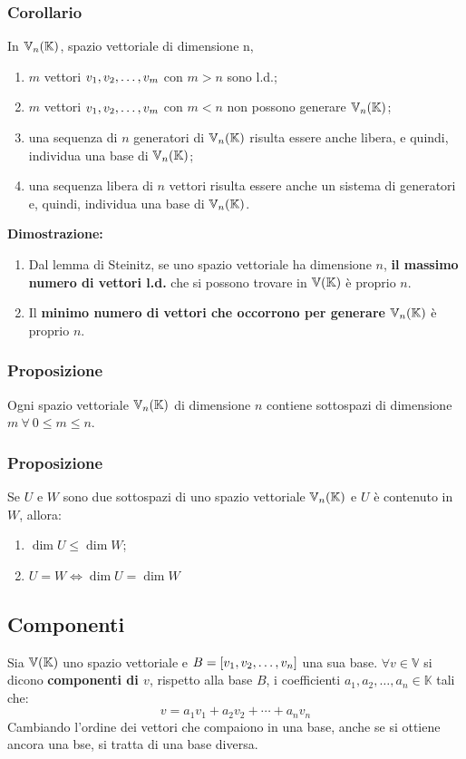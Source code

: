 \documentclass[../main.tex]{subfiles}
\begin{document}
\subsubsection{Corollario}
In $\mathbb{V}_n (\mathbb{K})$, spazio vettoriale di dimensione n,
\begin{enumerate}
    \item $m$ vettori $v_1, v_2, \ldots, v_{m}$ con $m > n$ sono l.d.;
    \item $m$ vettori $v_1, v_2, \ldots, v_{m}$ con $m < n$ non possono generare $\mathbb{V}_n (\mathbb{K})$;
    \item una sequenza di $n$ generatori di $\mathbb{V}_n (\mathbb{K})$ risulta essere anche libera, e
          quindi, individua una base di $\mathbb{V}_n (\mathbb{K})$;
    \item una sequenza libera di $n$ vettori risulta essere anche un sistema di
          generatori e, quindi, individua una base di $\mathbb{V}_n (\mathbb{K})$.
\end{enumerate}
\textbf{Dimostrazione:}
\begin{enumerate}
    \item Dal lemma di Steinitz, se uno spazio vettoriale ha dimensione $n$, \textbf{il
              massimo numero di vettori l.d.} che si possono trovare in $\mathbb{V} (\mathbb{K})$ è proprio $n$.
    \item Il \textbf{minimo numero di vettori che occorrono per generare} $\mathbb{V}_n (\mathbb{K})$ è
          proprio $n$.
\end{enumerate}

\subsubsection{Proposizione}
Ogni spazio vettoriale $\mathbb{V}_n (\mathbb{K})$ di dimensione $n$ contiene sottospazi di
dimensione $m \ \forall \ 0\leq m\leq n$.

\subsubsection{Proposizione}
Se $U$ e $W$ sono due sottospazi di uno spazio vettoriale $\mathbb{V}_n (\mathbb{K})$ e $U$ è
contenuto in $W$, allora:
\begin{enumerate}
    \item $\dim U\leq\dim W$;
    \item $U = W \iff \dim U = \dim W$
\end{enumerate}

\subsection{Componenti}
Sia $\mathbb{V} (\mathbb{K})$ uno spazio vettoriale e $B = [v_1, v_2, \ldots, v_{n}]$ una sua base. $\forall v \in
    \mathbb V$ si dicono \textbf{componenti di $v$}, rispetto alla base $B$, i
coefficienti $a_1, a_2,\ldots,a_n \in \mathbb K$ tali che:
\[
    v = a_1 v_1+a_2 v_2 +\cdots+a_n v_n
\]
Cambiando l'ordine dei vettori che compaiono in una base, anche se si ottiene
ancora una bse, si tratta di una base diversa.
\end{document}
